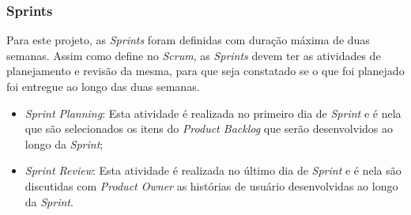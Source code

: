 \subsubsection{Sprints}

Para este projeto, as \textit{Sprints} foram definidas com duração máxima de duas semanas. Assim como define no \textit{Scrum}, as \textit{Sprints} devem ter as atividades de planejamento e revisão da mesma, para que seja constatado se o que foi planejado foi entregue ao longo das duas semanas.

\begin{itemize}
    \item \textit{Sprint Planning}: Esta atividade é realizada no primeiro dia de \textit{Sprint} e é nela que são selecionados os itens do \textit{Product Backlog} que serão desenvolvidos ao longo da \textit{Sprint};
    \item \textit{Sprint Review}: Esta atividade é realizada no último dia de \textit{Sprint} e é nela são discutidas com \textit{Product Owner} as histórias de usuário desenvolvidas ao longo da \textit{Sprint}.   
\end{itemize}